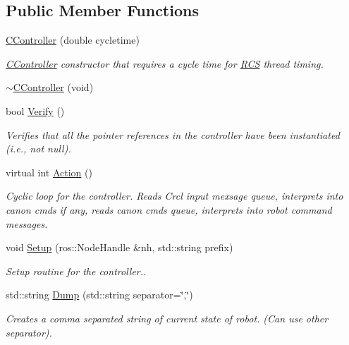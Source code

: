 \subsection*{Public Member Functions}
\begin{DoxyCompactItemize}
\item 
\hyperlink{structRCS_1_1CController_acf0744408b45b6d9f60cb44c9d64f1a8}{C\-Controller} (double cycletime)
\begin{DoxyCompactList}\small\item\em \hyperlink{structRCS_1_1CController}{C\-Controller} constructor that requires a cycle time for \hyperlink{namespaceRCS}{R\-C\-S} thread timing. \end{DoxyCompactList}\item 
\hyperlink{structRCS_1_1CController_a2bfe656f4d6a26d3dc4556ed8dab118a}{$\sim$\-C\-Controller} (void)
\item 
bool \hyperlink{structRCS_1_1CController_a7f04bc3e6f36033b2ea18bbac9c34a64}{Verify} ()
\begin{DoxyCompactList}\small\item\em Verifies that all the pointer references in the controller have been instantiated (i.\-e., not null). \end{DoxyCompactList}\item 
virtual int \hyperlink{structRCS_1_1CController_a0ca284e0879e57399044e6700630a526}{Action} ()
\begin{DoxyCompactList}\small\item\em Cyclic loop for the controller. Reads Crcl input mexsage queue, interprets into canon cmds if any, reads canon cmds queue, interprets into robot command messages. \end{DoxyCompactList}\item 
void \hyperlink{structRCS_1_1CController_a16ffe2c289a151554af8ed391774e215}{Setup} (ros\-::\-Node\-Handle \&nh, std\-::string prefix)
\begin{DoxyCompactList}\small\item\em Setup routine for the controller.. \end{DoxyCompactList}\item 
std\-::string \hyperlink{structRCS_1_1CController_aa7c4b106c4fb8064d896ccad7ce25b46}{Dump} (std\-::string separator=\char`\"{},\char`\"{})
\begin{DoxyCompactList}\small\item\em Creates a comma separated string of current state of robot. (Can use other separator). \end{DoxyCompactList}\item 

\end{DoxyCompactItemize}

